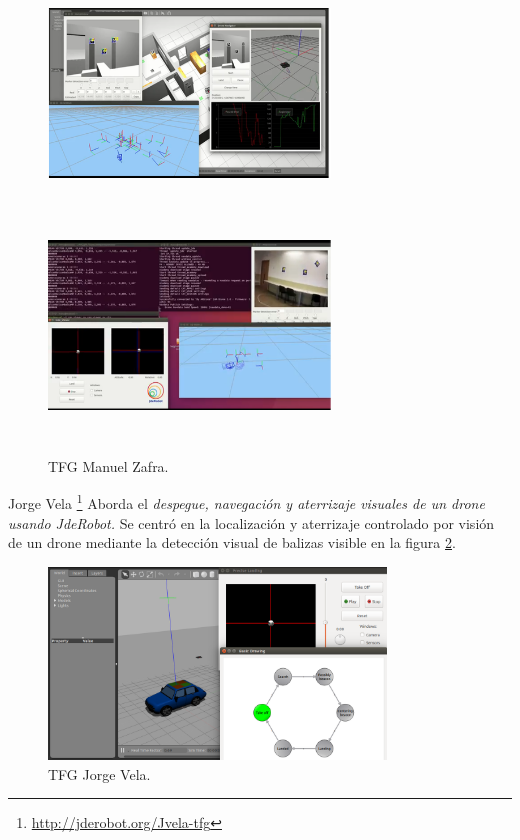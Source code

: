 \begin{figure}[H]
 \centering
    \includegraphics[width=7.5cm,height=6cm]{imag/IMG9.png}
    \includegraphics[width=7.5cm,height=6cm]{imag/IMG10.png}
 \caption{TFG Manuel Zafra.}
 \label{f:TFG Manuel Zafra}
\end{figure} 

\hspace{1cm} Jorge Vela \footnote{\url{http://jderobot.org/Jvela-tfg}} \cite{JorgeVela} Aborda el \textit{despegue, navegación y aterrizaje visuales de un drone usando JdeRobot.} Se centró en la localización y aterrizaje controlado por visión de un drone mediante la detección visual de balizas visible en la figura \ref{f:TFG Jorge Vela}.

\begin{figure}[H]
	\begin{center}
		\includegraphics[width=0.8\textwidth]{imag/IMG50.png}
				\caption{TFG Jorge Vela.}
	\label{f:TFG Jorge Vela}	
	\end{center}
\end{figure}

